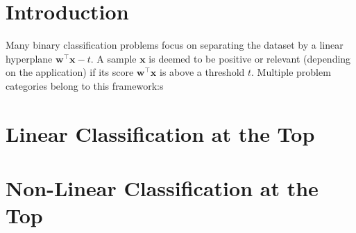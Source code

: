 \documentclass{Thesis}
\newcommand{\wb}{\bm{w}}
\newcommand{\xb}{\bm{x}}
\begin{document}
\chapter{Introduction}

Many binary classification problems focus on separating the dataset by a linear hyperplane $\wb^\top \xb - t$. A sample $\xb$ is deemed to be positive or relevant (depending on the application) if its score $\wb^\top \xb$ is above a threshold $t$. Multiple problem categories belong to this framework:s

\chapter{Linear Classification at the Top}

\chapter{Non-Linear Classification at the Top}

\cleardoublepage
{}
{}


\end{document}
